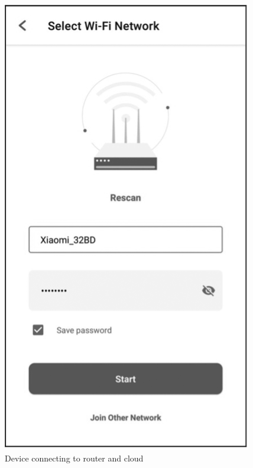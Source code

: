 \documentclass[a4paper,12pt,openany]{book}
\begin{document}
\begin{figure}[!h]
  \Centering
  \begin{minipage}[b]{0.45\textwidth}
    \includegraphics[height=1.5\textwidth]{D9Z/9-12}
    \caption{\Centering Device connecting to router and cloud}
  \end{minipage}
  \begin{minipage}[b]{0.45\textwidth}

\end{minipage}
\end{figure}
\end{document}
